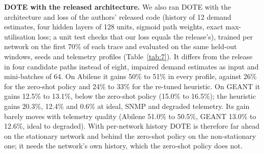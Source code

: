 \documentclass[journal]{IEEEtran}
\begin{document}
\textbf{DOTE with the released architecture.} We also ran DOTE with the architecture and loss of the authors' released code \cite{r1} (history of 12 demand estimates, four hidden layers of 128 units, sigmoid path weights, exact max-utilisation loss; a unit test checks that our loss equals the release's), trained per network on the first 70\% of each trace and evaluated on the same held-out windows, seeds and telemetry profiles (Table~\ref{tab:7}). It differs from the release in four candidate paths instead of eight, impaired demand estimates as input and mini-batches of 64. On Abilene it gains 50\% to 51\% in every profile, against 26\% for the zero-shot policy and 24\% to 33\% for the re-tuned heuristic. On GEANT it gains 12.5\% to 13.1\%, below the zero-shot policy (15.0\% to 16.5\%); the heuristic gains 20.3\%, 12.4\% and 0.6\% at ideal, SNMP and degraded telemetry. Its gain barely moves with telemetry quality (Abilene 51.0\% to 50.5\%, GEANT 13.0\% to 12.6\%, ideal to degraded). With per-network history DOTE is therefore far ahead on the stationary network and behind the zero-shot policy on the non-stationary one; it needs the network's own history, which the zero-shot policy does not.

\begin{table}[!t]
\caption{Gain over ECMP (\%) on held-out trace windows, mean over loads 0.6, 0.8 and 1.0 (10 evaluation seeds each), by telemetry profile. DOTE uses the released architecture and loss, trained on the first 70\% of the network's trace with ideal or degraded telemetry; the zero-shot policy is the mean of four training seeds; the heuristic is re-tuned per profile.}
\label{tab:7}
\centering
\scriptsize
\renewcommand{\arraystretch}{1.05}
\end{table}
\end{document}

